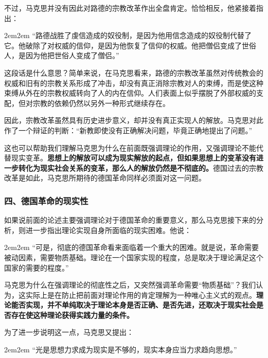 \documentclass[a4paper,twoside,12pt,AutoFakeBold]{ctexart}
\begin{document}
不过，马克思并没有因此对路德的宗教改革作出全盘肯定。恰恰相反，他紧接着指出：

\begin{adjustwidth}{2em}{2em}
\qquad\fangsong
“路德战胜了虔信造成的奴役制，是因为他用信念造成的奴役制代替了它。他破除了对权威的信仰，是因为他恢复了信仰的权威。他把僧侣变成了世俗人，是因为他把世俗人变成了僧侣。”
\end{adjustwidth}

这段话是什么意思？简单来说，在马克思看来，路德的宗教改革虽然对传统教会的权威和旧有的宗教关系形成了冲击，却没有真正消除宗教对人的束缚，而是使这种束缚从外在的宗教权威转向了人的内在信仰。人们表面上似乎摆脱了外部权威的支配，但对宗教的依赖仍然以另外一种形式继续存在。

因此，宗教改革虽然具有历史进步意义，却并没有真正实现人的解放。马克思对此作了一个辩证的判断：“新教即使没有正确解决问题，毕竟正确地提出了问题。”

这也可以帮助我们理解马克思为什么在前面既强调理论的作用，又强调理论不能代替现实变革。\textbf{思想上的解放可以成为现实解放的起点，但如果思想上的变革没有进一步转化为现实社会关系的变革，那么人的解放仍然是不彻底的。}德国过去的宗教改革是如此，马克思所期待的德国革命同样必须面对这一问题。

\subsubsection{四、德国革命的现实性}\label{sec:2.6}

如果说前面的论述主要强调理论对于德国革命的重要意义，那么马克思接下来的分析，则进一步指出理论实现自身所面临的现实困难。他说：

\begin{adjustwidth}{2em}{2em}
\qquad\fangsong
“可是，彻底的德国革命看来面临着一个重大的困难。就是说，革命需要被动因素，需要物质基础。理论在一个国家实现的程度，总是取决于理论满足这个国家的需要的程度。”
\end{adjustwidth}

马克思为什么在强调理论的彻底性之后，又突然强调革命需要“物质基础”？我们认为，这实际上是在防止把前面对理论作用的肯定理解为一种唯心主义式的观点。\textbf{理论能否实现，并不单纯取决于理论本身是否正确、是否先进，还取决于现实社会是否存在使这种理论获得实践力量的条件。}

为了进一步说明这一点，马克思又提出：

\begin{adjustwidth}{2em}{2em}
\qquad\fangsong
“光是思想力求成为现实是不够的，现实本身应当力求趋向思想。”
\end{adjustwidth}
\end{document}
